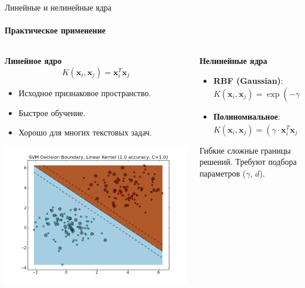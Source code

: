 \documentclass[notheorems, handout]{beamer}
\begin{document}
\begin{frame}{Линейные и нелинейные ядра}
	\framesubtitle{Практическое применение}
	\small

	\begin{columns}
		\begin{column}{0.5\textwidth}
			\textbf{Линейное ядро}
			\vspace{-3mm}
			\[
			K(\mathbf{x}_i, \mathbf{x}_j) = \mathbf{x}_i^T \mathbf{x}_j
			\]
			\vspace{-6mm}
			\begin{itemize}
				\item Исходное признаковое пространство.
				\item Быстрое обучение.
				\item Хорошо для многих текстовых задач.
			\end{itemize}
			\includegraphics[width=\textwidth]{img/linear_kernal.jpg}
		\end{column}
		\begin{column}{0.5\textwidth}
			\textbf{Нелинейные ядра}
			\vspace{-3mm}
			\begin{itemize}
				\item \textbf{RBF (Gaussian)}:
			$K(\mathbf{x}_i, \mathbf{x}_j) = \exp(-\gamma ||\mathbf{x}_i - \mathbf{x}_j||^2)$
			\item \textbf{Полиномиальное}:
			$K(\mathbf{x}_i, \mathbf{x}_j) = (\gamma \cdot \mathbf{x}_i^T \mathbf{x}_j + r)^d$
			\end{itemize}
			Гибкие сложные границы решений. Требуют подбора параметров ($\gamma$, $d$).

\end{column}
\end{columns}
\end{frame}
\end{document}
